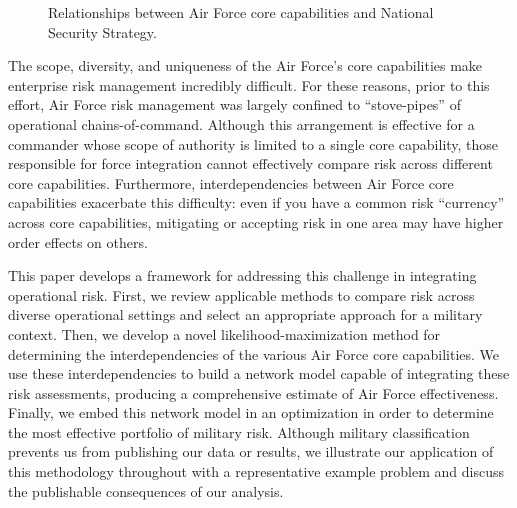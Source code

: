 \documentclass{article}
\begin{document}
\begin{figure}[!htb]
\label{fig:nss-network}
\caption{Relationships between Air Force core capabilities and National Security Strategy.}
\end{figure}

The scope, diversity, and uniqueness of the Air Force's core capabilities make enterprise risk management incredibly difficult. For these reasons, prior to this effort, Air Force risk management was largely confined to ``stove-pipes'' of operational chains-of-command. Although this arrangement is effective for a commander whose scope of authority is limited to a single core capability, those responsible for force integration cannot effectively compare risk across different core capabilities. Furthermore, interdependencies between Air Force core capabilities exacerbate this difficulty: even if you have a common risk ``currency'' across core capabilities, mitigating or accepting risk in one area may have higher order effects on others.

This paper develops a framework for addressing this challenge in integrating operational risk. First, we review applicable methods to compare risk across diverse operational settings and select an appropriate approach for a military context. Then, we develop a novel likelihood-maximization method for determining the interdependencies of the various Air Force core capabilities. We use these interdependencies to build a network model capable of integrating these risk assessments, producing a comprehensive estimate of Air Force effectiveness. Finally, we embed this network model in an optimization in order to determine the most effective portfolio of military risk. Although military classification prevents us from publishing our data or results, we illustrate our application of this methodology throughout with a representative example problem and discuss the publishable consequences of our analysis.
\end{document}
